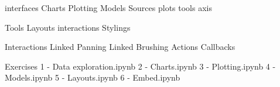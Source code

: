 interfaces
Charts
Plotting
Models
 Sources
 plots
 tools
 axis

Tools
Layouts 
interactions 
Stylings

Interactions
  Linked Panning
  Linked Brushing
  Actions
  Callbacks


Exercises
1 - Data exploration.ipynb
2 - Charts.ipynb
3 - Plotting.ipynb
4 - Models.ipynb
5 - Layouts.ipynb
6 - Embed.ipynb
